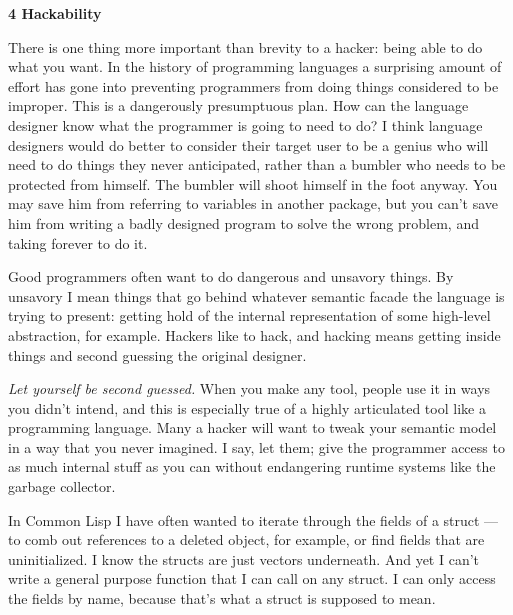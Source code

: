\documentclass[12pt]{book}
\begin{document}
\textbf{4 Hackability}

There is one thing more important than brevity to a hacker: being able
to do what you want. In the history of programming languages a
surprising amount of effort has gone into preventing programmers from
doing things considered to be improper. This is a dangerously
presumptuous plan. How can the language designer know what the
programmer is going to need to do? I think language designers would do
better to consider their target user to be a genius who will need to do
things they never anticipated, rather than a bumbler who needs to be
protected from himself. The bumbler will shoot himself in the foot
anyway. You may save him from referring to variables in another package,
but you can't save him from writing a badly designed program to solve
the wrong problem, and taking forever to do it.

Good programmers often want to do dangerous and unsavory things. By
unsavory I mean things that go behind whatever semantic facade the
language is trying to present: getting hold of the internal
representation of some high-level abstraction, for example. Hackers like
to hack, and hacking means getting inside things and second guessing the
original designer.

\emph{Let yourself be second guessed.} When you make any tool, people
use it in ways you didn't intend, and this is especially true of a
highly articulated tool like a programming language. Many a hacker will
want to tweak your semantic model in a way that you never imagined. I
say, let them; give the programmer access to as much internal stuff as
you can without endangering runtime systems like the garbage collector.

In Common Lisp I have often wanted to iterate through the fields of a
struct --- to comb out references to a deleted object, for example, or
find fields that are uninitialized. I know the structs are just vectors
underneath. And yet I can't write a general purpose function that I can
call on any struct. I can only access the fields by name, because that's
what a struct is supposed to mean.
\end{document}

